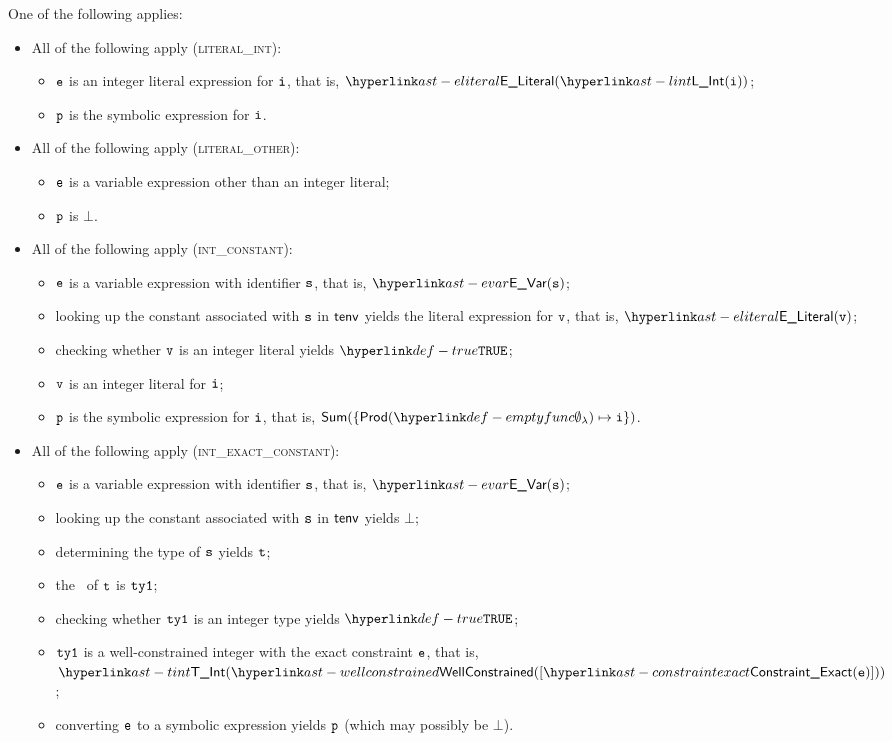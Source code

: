 One of the following applies:
\begin{itemize}
  \item All of the following apply (\textsc{literal\_int}):
  \begin{itemize}
    \item $\texttt{e}$ is an integer literal expression for $\texttt{i}$, that is, $\ELiteral(\lint(\vi))$;
    \item $\texttt{p}$ is the symbolic expression for $\texttt{i}$.
  \end{itemize}

  \item All of the following apply (\textsc{literal\_other}):
  \begin{itemize}
    \item $\texttt{e}$ is a variable expression other than an integer literal;
    \item $\texttt{p}$ is $\bot$.
  \end{itemize}

  \item All of the following apply (\textsc{int\_constant}):
  \begin{itemize}
    \item $\texttt{e}$ is a variable expression with identifier $\texttt{s}$, that is, $\EVar(\vs)$;
    \item looking up the constant associated with $\texttt{s}$ in $\textsf{tenv}$ yields the literal expression for $\texttt{v}$, that is, $\ELiteral(\vv)$;
    \item checking whether $\texttt{v}$ is an integer literal yields $\True$\ProseOrTypeError;
    \item $\texttt{v}$ is an integer literal for $\texttt{i}$;
    \item $\texttt{p}$ is the symbolic expression for $\texttt{i}$, that is, $\Sum( \{ \Prod(\emptyfunc)\mapsto \vi \} )$.
  \end{itemize}

  \item All of the following apply (\textsc{int\_exact\_constant}):
  \begin{itemize}
    \item $\texttt{e}$ is a variable expression with identifier $\texttt{s}$, that is, $\EVar(\vs)$;
    \item looking up the constant associated with $\texttt{s}$ in $\textsf{tenv}$ yields $\bot$;
    \item determining the type of $\texttt{s}$ yields $\texttt{t}$\ProseOrTypeError;
    \item the \underlyingtype\ of $\texttt{t}$ is $\texttt{ty1}$\ProseOrTypeError;
    \item checking whether $\texttt{ty1}$ is an integer type yields $\True$\ProseOrTypeError;
    \item $\texttt{ty1}$ is a well-constrained integer with the exact constraint $\texttt{e}$, that is, \\ $\TInt(\wellconstrained([\ConstraintExact(\ve)]))$;
    \item converting $\texttt{e}$ to a symbolic expression yields $\texttt{p}$ (which may possibly be $\bot$).
  \end{itemize}


\end{itemize}

